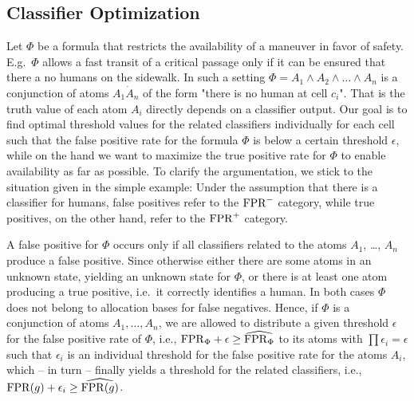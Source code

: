 \subsection{Classifier Optimization}
Let $\Phi$ be a formula that restricts the availability of a maneuver in favor of safety. 
E.g.\ $\Phi$ allows a fast transit of a critical passage only if it can be ensured that there a no humans on the sidewalk. In such a setting $\Phi = A_1 \land A_2 \land \dots \land A_n$ is a conjunction of atoms $A_1 \dot A_n$ of the form "there is no human at cell $c_i$". That is the truth value of each atom $A_i$ directly depends on a classifier output. Our goal is to find optimal threshold values for the related classifiers individually for each cell such that the false positive rate for the formula $\Phi$ is below a certain threshold $\epsilon$, while on the hand we want to maximize the true positive rate for $\Phi$ to enable availability as far as possible.
To clarify the argumentation, we stick to the situation given in the simple example: Under the assumption that there is a classifier for humans, false positives refer to the $\mathrm{FPR}^-$ category, while true positives, on the other hand, refer to the $\mathrm{FPR}^+$ category.

A false positive for $\Phi$ occurs only if all classifiers related to the atoms 
$A_1$, \dots, $A_n$ produce a false positive. Since otherwise either there are some
atoms in an unknown state, yielding an unknown state for $\Phi$, or there is at least
one atom producing a true positive, i.e.\ it correctly identifies a human. In both cases $\Phi$ does not belong to allocation bases for false negatives.%
Hence, if $\Phi$ is a conjunction of atoms $A_1,\dots,A_n$, we are allowed to distribute a given threshold $\epsilon$ for the false positive rate of $\Phi$, i.e., $\mathrm{FPR}_\Phi+\epsilon\geq\widehat{\mathrm{FPR}_\Phi}$ to its atoms with 
$\prod\epsilon_i = \epsilon$ such that $\epsilon_i$ is an individual threshold for the false positive rate for the atoms $A_i$, which -- in turn -- finally yields a threshold for the related classifiers, i.e., $\mathrm{FPR}(g)+\epsilon_i \geq  \widehat{\mathrm{FPR}(g)}$.







